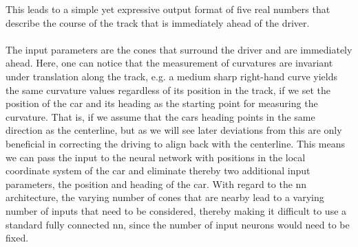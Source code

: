 This leads to a simple yet expressive output format of five real numbers that describe the course of the track that is immediately ahead of the driver. \\\\The input parameters are the cones that surround the driver and are immediately ahead. Here, one can notice that the measurement of curvatures are invariant under translation along the track, e.g. a medium sharp right-hand curve yields the same curvature values regardless of its position in the track, if we set the position of the car and its heading as the starting point for measuring the curvature. That is, if we assume that the cars heading points in the same direction as the centerline, but as we will see later deviations from this are only beneficial in correcting the driving to align back with the centerline. This means we can pass the input to the neural network with positions in the local coordinate system of the car and eliminate thereby two additional input parameters, the position and heading of the car. With regard to the \ac{nn} architecture, the varying number of cones that are nearby lead to a varying number of inputs that need to be considered, thereby making it difficult to use a standard fully connected \ac{nn}, since the number of input neurons would need to be fixed.
